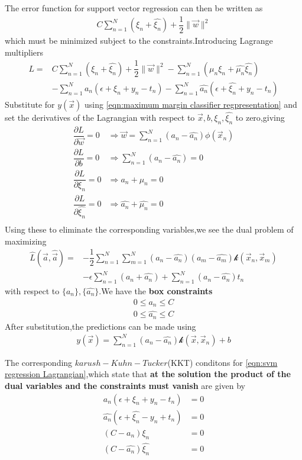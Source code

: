 The error function for support vector regression can then be written as
\begin{align}
C\sum\limits_{n=1}^{N}(\xi_n+\hat{\xi_n})+\dfrac{1}{2}\parallel\vec{w}\parallel^2
\end{align}
which must be minimized subject to the constraints.Introducing Lagrange multipliers
\begin{align}\label{eqn:svm regression Lagrangian}
L =& C\sum\limits_{n=1}^{N}(\xi_n+\hat{\xi_n})+\dfrac{1}{2}\parallel\vec{w}\parallel^2
- \sum\limits_{n=1}^{N}(\mu_n\xi_n+\hat{\mu_n}\hat{\xi_n}) \\
&-\sum\limits_{n=1}^{N}a_n(\epsilon+\xi_n+y_n-t_n) -\sum\limits_{n=1}^{N}\hat{a_n}(\epsilon+\hat{\xi_n}+y_n-t_n)
\end{align}
Substitute for $y(\vec{x})$ using \ref{eqn:maximum margin classifier regpresentation} and set the derivatives of the Lagrangian with respect to $\vec{x},b,\xi_n,\hat{\xi_n}$ to zero,giving
\begin{align}
\dfrac{\partial L}{\partial\vec{w}} =0 &\Rightarrow \vec{w}=\sum_{n=1}^{N}(a_n-\hat{a_n})\phi(\vec{x}_n) \\
\dfrac{\partial L}{\partial b} =0 &\Rightarrow \sum_{n=1}^{N}(a_n-\hat{a_n})=0 \\
\dfrac{\partial L}{\partial\xi_n} =0 &\Rightarrow a_n+\mu_n=0 \\
\dfrac{\partial L}{\partial\hat{\xi_n}} =0 &\Rightarrow \hat{a_n}+\hat{\mu_n}=0 \\
\end{align}
Using these to eliminate the corresponding variables,we see the dual problem of maximizing 
\begin{align}
\hat{L}(\vec{a},\hat{\vec{a}}) =&-\dfrac{1}{2}\sum_{n=1}^{N}\sum_{m=1}^{N}(a_n-\hat{a_n})(a_m-\hat{a_m})\mathcal{k}(\vec{x}_n,\vec{x}_m) \\
 &-\epsilon\sum_{n=1}^{N}(a_n+\hat{a_n})+\sum_{n=1}^{N}(a_n-\hat{a_n})t_n
\end{align}
with respect to $\{a_n\},\{\hat{a_n}\}	$.We have the \textbf{box constraints}
\begin{align}
0\leq a_n \leq C\\
0\leq \hat{a_n}\leq C
\end{align}
After substitution,the predictions can be made using
\begin{align}
y(\vec{x})=\sum_{n=1}^{N}(a_n-\hat{a_n})\mathcal{k}(\vec{x},\vec{x}_n)+b
\end{align}

The corresponding $karush-Kuhn-Tucker$(KKT) conditons for \ref{eqn:svm regression Lagrangian},which state that \textbf{at the solution the product of the dual variables and the constraints must vanish} are given by
\begin{align}
a_n(\epsilon+\xi_n+y_n-t_n) &= 0\\
\hat{a_n}(\epsilon+\hat{\xi_n}-y_n+t_n) &= 0\\
(C-a_n)\xi_n & = 0\\
(C-\hat{a_n})\hat{\xi_n} &=0
\end{align}

